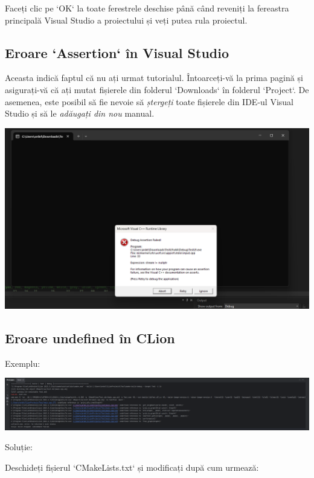 \documentclass[../ro-fa-lab.tex]{subfiles}
\begin{document}
Faceți clic pe `OK` la toate ferestrele deschise până când reveniți la fereastra principală Visual Studio a proiectului și veți putea rula proiectul.

\subsection{Eroare `Assertion` în Visual Studio}\label{visual-studio-assertion-error}

Aceasta indică faptul că nu ați urmat tutorialul. Întoarceți-vă la prima pagină și asigurați-vă că ați mutat fișierele din folderul `Downloads` în folderul `Project`. De asemenea, este posibil să fie nevoie să \emph{ștergeți} toate fișierele din IDE-ul Visual Studio și să le \emph{adăugați din nou} manual.

\includegraphics[width=\textwidth,alt={A screenshot of a computer Description automatically generated}]{./Resources/tutorial_lab9/image15.png}

\subsection{Eroare undefined în CLion}\label{clion-undefined-error}

Exemplu:

\includegraphics[width=\textwidth,alt={A screen shot of a computer Description automatically generated}]{./Resources/tutorial_lab9/image16.png}

Soluție:

Deschideți fișierul `CMakeLists.txt` și modificați după cum urmează:
\end{document}
